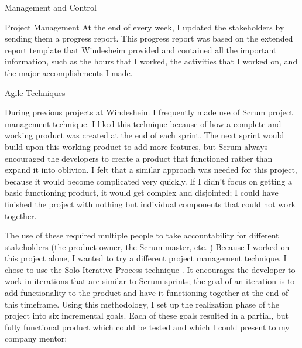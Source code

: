 \documentclass{matthijs}
\begin{document}
\begin{hoofdstuk}{Management and Control}
\begin{paragraaf}{Project Management}
			\noindent At the end of every week, I updated the stakeholders by sending them a progress report.
			This progress report was based on the extended report template that Windesheim provided and contained all the important information, such as the hours that I worked, the activities that I worked on, and the major accomplishments I made.

		\end{paragraaf}

		\begin{paragraaf}{Agile Techniques}
			
			During previous projects at Windesheim I frequently made use of Scrum project management technique.
			I liked this technique because of how a complete and working product was created at the end of each sprint.
			The next sprint would build upon this working product to add more features, but Scrum always encouraged the developers to create a product that functioned rather than expand it into oblivion.
			I felt that a similar approach was needed for this project, because it would become complicated very quickly.
			If I didn’t focus on getting a basic functioning product, it would get complex and disjointed; I could have finished the project with nothing but individual components that could not work together.
			
			The use of these required multiple people to take accountability for different stakeholders (the product owner, the Scrum master, etc. \cite{gant2019scrum})
			Because I worked on this project alone, I wanted to try a different project management technique.
			I chose to use the Solo Iterative Process technique \cite{dorman2012sip}.
			It encourages the developer to work in iterations that are similar to Scrum sprints; the goal of an iteration is to add functionality to the product and have it functioning together at the end of this timeframe.
			Using this methodology, I set up the realization phase of the project into six incremental goals.
			Each of these goals resulted in a partial, but fully functional product which could be tested and which I could present to my company mentor:
		
			\begin{enumerate}


\end{enumerate}
\end{paragraaf}
\end{hoofdstuk}
\end{document}
